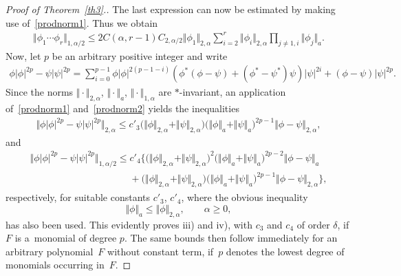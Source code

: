 \documentclass[pdftex]{sigma}
\begin{document}
\begin{proof}[Proof of Theorem~\ref{th3}.]
The last expression can now be estimated by making use of~\eqref{prodnorm1}. Thus we obtain
\begin{gather}\label{prodnorm2}
\Vert\phi_1\cdots\phi_r\Vert_{1,\alpha/2}
\leq 2 C(\alpha,r-1)C_{2,\alpha/2} \Vert\phi_1\Vert_{2,\alpha} \sum_{i=2}^r\Vert\phi_i\Vert_{2,\alpha}
\prod_{j\ne 1,i}\Vert\phi_j\Vert_a .
\end{gather}
Now, let $p$ be an arbitrary positive integer and write
\begin{gather*}
\phi |\phi|^{2p}-\psi |\psi|^{2p}
=\sum_{i=0}^{p-1}\phi |\phi|^{2(p-1-i)}
(\phi^* (\phi-\psi)+(\phi^*-\psi^*) \psi) |\psi|^{2i}
+(\phi-\psi) |\psi|^{2p} .
\end{gather*}
Since the norms $\Vert\cdot\Vert_{2,\alpha}$, $\Vert\cdot\Vert_a$, $\Vert\cdot\Vert_{1,\alpha}$
are  $*$-invariant, an application of~\eqref{prodnorm1}
and~\eqref{prodnorm2} yields the inequalities
\begin{gather*}
\Vert\phi |\phi|^{2p}-\psi |\psi|^{2p}\Vert_{2,\alpha}
\leq c'_3 \big(\Vert\phi\Vert_{2,\alpha}+\Vert\psi\Vert_{2,\alpha}\big)
\big(\Vert\phi\Vert_a+\Vert\psi\Vert_a\big)^{2p-1}\Vert\phi-\psi\Vert_{2,\alpha} ,
\end{gather*}
and
\begin{gather*}
 \Vert\phi |\phi|^{2p}-\psi |\psi|^{2p}\Vert_{1,\alpha/2}
 \leq c'_4
\Big\{\big(\Vert\phi\Vert_{2,\alpha}+\Vert\psi\Vert_{2,\alpha}\big)^2
\big(\Vert\phi\Vert_a+\Vert\psi\Vert_a\big)^{2p-2}\Vert\phi-\psi\Vert_a\\
\phantom{\Vert\phi |\phi|^{2p}-\psi |\psi|^{2p}\Vert_{1,\alpha/2}\leq}{}
+
\big(\Vert\phi\Vert_{2,\alpha}+\Vert\psi\Vert_{2,\alpha}\big)
\big(\Vert\phi\Vert_a+\Vert\psi\Vert_a\big)^{2p-1}\Vert\phi-\psi\Vert_{2,\alpha}\Big\} ,
\end{gather*}
respectively, for suitable constants $c'_3$, $c'_4$, where the
obvious inequality
\[
\Vert\phi\Vert_a \leq \Vert\phi\Vert_{2,\alpha} ,\qquad \alpha\geq 0 ,
\]
has also been used. This evidently proves iii) and iv), with $c_3$ and
$c_4$ of order $\delta$, if $F$ is a~monomial of degree $p$. The same bounds then follow immediately for an
arbitrary polynomial~$F$ without constant term, if~$p$ denotes the
lowest degree of monomials occurring in~$F$.
\end{proof}
\end{document}
